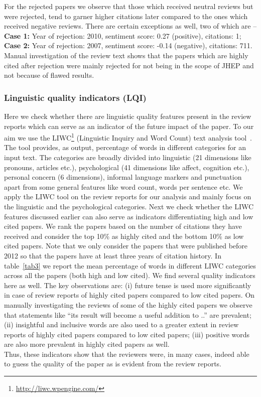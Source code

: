 For the rejected papers we observe that those which received neutral reviews but were rejected, tend to garner higher citations later compared to the ones which received negative reviews. There are certain exceptions as well, two of which are -- {\bf Case 1:} Year of rejection: 2010, sentiment score: 0.27 (positive), citations: 1; {\bf Case 2:} Year of rejection: 2007, sentiment score: -0.14 (negative), citations: 711.
Manual investigation of the review text shows that the papers which are highly cited after rejection were mainly rejected for not being in the scope of JHEP and not because of flawed results. 

\subsubsection{Linguistic quality indicators (LQI)}

Here we check whether there are linguistic quality features present in the review reports which can serve as an indicator of the future impact of the paper. To our aim we use the LIWC\footnote{\url{http://liwc.wpengine.com/}} (Linguistic Inquiry and Word Count) text analysis tool~\cite{pennebaker2007development}. The tool provides, as output, percentage of words in different categories for an input text. The categories are broadly divided into linguistic (21 dimensions like pronouns, articles etc.), psychological (41 dimensions like affect, cognition etc.), personal concern (6 dimensions), informal language markers and punctuation apart from some general features like word count, words per sentence etc. We apply the LIWC tool on the review reports for our analysis and mainly focus on the linguistic and the psychological categories.
Next we check whether the LIWC features discussed earlier can also serve as indicators differentiating high and low cited papers. We rank the papers based on the number of citations they have received and consider the top 10\% as highly cited and the bottom 10\% as low cited papers. Note that we only consider the papers that were published before 2012 so that the papers have at least three years of citation history. In table~\ref{tab3} we report the mean percentage of words in different LIWC categories across all the papers (both high and low cited). We find several quality indicators here as well. The key observations are: (i) future tense is used more significantly in case of review reports of highly cited papers compared to low cited papers. On manually investigating the reviews of some of the highly cited papers we observe that statements like ``its result will become a useful addition to ..'' are prevalent; (ii) insightful and inclusive words are also used to a greater extent in review reports of highly cited papers compared to low cited papers; (iii) positive words are also more prevalent in highly cited papers as well.\\
Thus, these indicators show that the reviewers were, in many cases, indeed able to guess the quality of the paper as is evident from the review reports.

